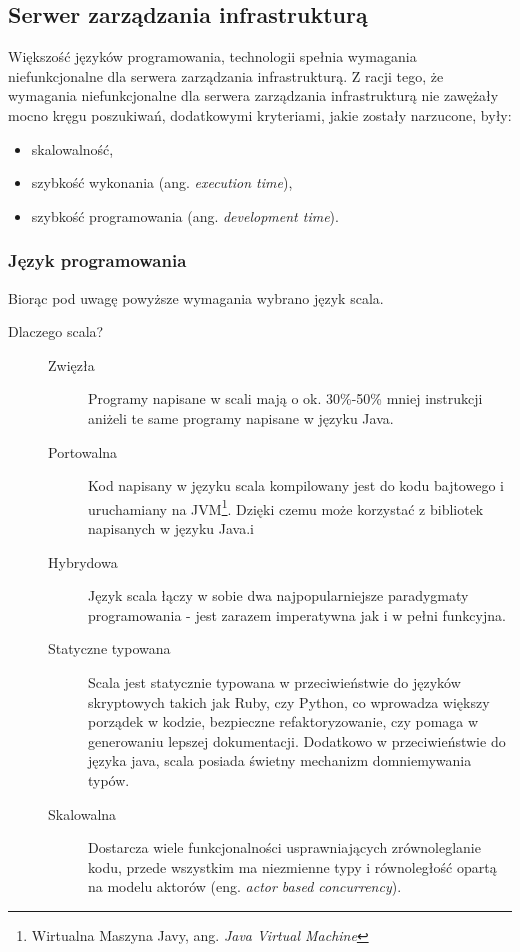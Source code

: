 \subsection{Serwer zarządzania infrastrukturą}

Większość języków programowania, technologii spełnia wymagania niefunkcjonalne dla serwera zarządzania infrastrukturą. Z racji tego, że wymagania niefunkcjonalne dla serwera zarządzania infrastrukturą nie zawężały mocno kręgu poszukiwań, dodatkowymi kryteriami, jakie zostały narzucone, były:

\begin{itemize}
	\item skalowalność,
	\item szybkość wykonania (ang. \emph{execution time}),
	\item szybkość programowania (ang. \emph{development time}).
\end{itemize}

\subsubsection{Język programowania}

Biorąc pod uwagę powyższe wymagania wybrano język scala.


\begin{description}
	\item[Dlaczego scala?] \hfill \par 
	\begin{description}
		\item[Zwięzła] \hfill \par
			Programy napisane w scali mają o ok. 30\%-50\% mniej instrukcji aniżeli te same programy napisane w języku Java.
		\item[Portowalna] \hfill \par
			Kod napisany w języku scala kompilowany jest do kodu bajtowego i uruchamiany na JVM\footnote{Wirtualna Maszyna Javy, ang. \emph{Java Virtual Machine}}. Dzięki czemu może korzystać z bibliotek napisanych w języku Java.i
		\item[Hybrydowa] \hfill \par
			Język scala łączy w sobie dwa najpopularniejsze paradygmaty programowania - jest zarazem imperatywna jak i w pełni funkcyjna.
		\item[Statyczne typowana] \hfill \par
			Scala jest statycznie typowana w przeciwieństwie do języków skryptowych takich jak Ruby, czy Python, co wprowadza większy porządek w kodzie, bezpieczne refaktoryzowanie, czy pomaga w generowaniu lepszej dokumentacji. Dodatkowo w przeciwieństwie do języka java, scala posiada świetny mechanizm domniemywania typów.
		\item[Skalowalna] \hfill \par
			Dostarcza wiele funkcjonalności usprawniających zrównoleglanie kodu, przede wszystkim ma niezmienne typy i równoległość opartą na modelu aktorów (eng. \emph{actor based concurrency}).
	\end{description}
\end{description}


